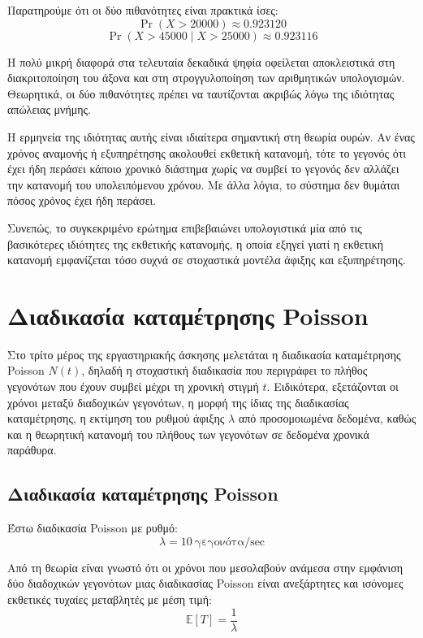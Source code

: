 \documentclass{article}
\begin{document}
Παρατηρούμε ότι οι δύο πιθανότητες είναι πρακτικά ίσες:
\[
\Pr(X > 20000) \approx 0.923120
\]
\[
\Pr(X > 45000 \mid X > 25000) \approx 0.923116
\]

Η πολύ μικρή διαφορά στα τελευταία δεκαδικά ψηφία οφείλεται αποκλειστικά στη
διακριτοποίηση του άξονα και στη στρογγυλοποίηση των αριθμητικών υπολογισμών.
Θεωρητικά, οι δύο πιθανότητες πρέπει να ταυτίζονται ακριβώς λόγω της ιδιότητας
απώλειας μνήμης.

Η ερμηνεία της ιδιότητας αυτής είναι ιδιαίτερα σημαντική στη θεωρία ουρών. Αν ένας
χρόνος αναμονής ή εξυπηρέτησης ακολουθεί εκθετική κατανομή, τότε το γεγονός ότι έχει
ήδη περάσει κάποιο χρονικό διάστημα χωρίς να συμβεί το γεγονός δεν αλλάζει την
κατανομή του υπολειπόμενου χρόνου. Με άλλα λόγια, το σύστημα δεν θυμάται πόσος χρόνος
έχει ήδη περάσει.

Συνεπώς, το συγκεκριμένο ερώτημα επιβεβαιώνει υπολογιστικά μία από τις βασικότερες
ιδιότητες της εκθετικής κατανομής, η οποία εξηγεί γιατί η εκθετική κατανομή
εμφανίζεται τόσο συχνά σε στοχαστικά μοντέλα άφιξης και εξυπηρέτησης.

\newpage
\section{Διαδικασία καταμέτρησης Poisson}

Στο τρίτο μέρος της εργαστηριακής άσκησης μελετάται η διαδικασία καταμέτρησης Poisson
\(N(t)\), δηλαδή η στοχαστική διαδικασία που περιγράφει το πλήθος γεγονότων που έχουν
συμβεί μέχρι τη χρονική στιγμή \(t\). Ειδικότερα, εξετάζονται οι χρόνοι μεταξύ
διαδοχικών γεγονότων, η μορφή της ίδιας της διαδικασίας καταμέτρησης, η εκτίμηση του
ρυθμού άφιξης \(\lambda\) από προσομοιωμένα δεδομένα, καθώς και η θεωρητική κατανομή του
πλήθους των γεγονότων σε δεδομένα χρονικά παράθυρα.

\subsection{Διαδικασία καταμέτρησης Poisson}

Έστω διαδικασία Poisson με ρυθμό:
\[
\lambda = 10\ \text{γεγονότα/sec}
\]

Από τη θεωρία είναι γνωστό ότι οι χρόνοι που μεσολαβούν ανάμεσα στην εμφάνιση δύο
διαδοχικών γεγονότων μιας διαδικασίας Poisson είναι ανεξάρτητες και ισόνομες
εκθετικές τυχαίες μεταβλητές με μέση τιμή:
\begin{equation}
    \mathbb{E}[T] = \frac{1}{\lambda}
\end{equation}
\end{document}
